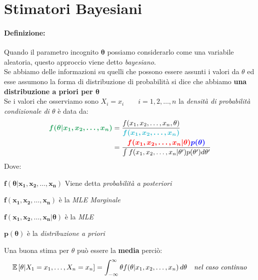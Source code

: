 \documentclass[]{article}
\makeatletter
\def\mathcolor#1#{\@mathcolor{#1}}
\def\@mathcolor#1#2#3{%
  \protect\leavevmode
  \begingroup
    \color#1{#2}#3%
  \endgroup
}
\newcommand{\ev}{\mathbb{E}[X]}
\renewcommand{\ev}[1]{\mathbb{E}\left[#1\right]}
\newcommand{\definizione}{\paragraph{Definizione:}}
\makeatother
\begin{document}
    \section{Stimatori Bayesiani}
    \definizione Quando il parametro incognito $\boldsymbol{\theta}$ possiamo considerarlo come una variabile aleatoria, questo approccio viene detto \textit{bayesiano}. \\
    Se abbiamo delle informazioni su quelli che possono essere assunti i valori da $\theta$ ed esse assumono la forma di distribuzione di probabilità si dice che abbiamo \textbf{una distribuzione a priori per $\boldsymbol{\theta}$} \\[2ex]
    Se i valori che osserviamo sono $X_i = x_i \qquad i=1,2, \ldots, n$ la \textit{densità di probabilità condizionale di $\theta$} è data da:
    \begin{equation*}
        \begin{split}
            \mathcolor{ForestGreen}{\boldsymbol{f(\theta \rvert x_1, x_2, \ldots, x_n)}} &= \frac{f(x_1, x_2, \ldots, x_n, \theta)}{\mathcolor{Turquoise}{\boldsymbol{f(x_1, x_2, \ldots, x_n)}}} \\
            &= \frac{\mathcolor{red}{\boldsymbol{f(x_1, x_2, \ldots, x_n \rvert \theta)}} \mathcolor{blue}{\boldsymbol{p(\theta)}}}{\int_{}^{} f(x_1, x_2, \ldots, x_n \rvert \theta') p(\theta') d\theta'}
        \end{split}
    \end{equation*}
    Dove:
    \begin{itemize}
        {\color{ForestGreen} \item $\boldsymbol{f(\theta \rvert x_1, x_2, \ldots, x_n)}$ Viene detta \textit{probabilità a posteriori}}
        {\color{Turquoise} \item $\boldsymbol{f(x_1, x_2, \ldots, x_n)}$ è la \textit{MLE Marginale}}
        {\color{red} \item $\boldsymbol{f(x_1, x_2, \ldots, x_n \rvert \theta)}$ è la \textit{MLE}}
        {\color{blue} \item $\boldsymbol{p(\theta)}$ è la \textit{distribuzione a priori}}
    \end{itemize}
    Una buona stima per $\theta$ può essere la \textbf{media} perciò:
    \[ \ev{\theta \rvert X_1 = x_1, \ldots, X_n = x_n} = \int_{-\infty}^{\infty} \theta f(\theta \rvert x_1, x_2, \ldots, x_n) \, d\theta \quad \text{\textit{nel caso continuo}} \]
\end{document}
